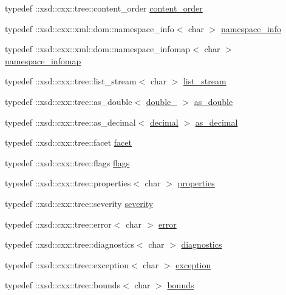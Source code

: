 \begin{DoxyCompactItemize}
\item 
typedef \+::xsd\+::cxx\+::tree\+::content\+\_\+order \hyperlink{namespacexml__schema_ae41cf99d54d24cb0112ce5dc08726476}{content\+\_\+order}
\item 
typedef \+::xsd\+::cxx\+::xml\+::dom\+::namespace\+\_\+info$<$ char $>$ \hyperlink{namespacexml__schema_a3bd77dc3d8c54be1c5369ce1aa8abebf}{namespace\+\_\+info}
\item 
typedef \+::xsd\+::cxx\+::xml\+::dom\+::namespace\+\_\+infomap$<$ char $>$ \hyperlink{namespacexml__schema_a17712c8260e03226f0a9e4d21ab78f42}{namespace\+\_\+infomap}
\item 
typedef \+::xsd\+::cxx\+::tree\+::list\+\_\+stream$<$ char $>$ \hyperlink{namespacexml__schema_a840728106ddd08800e62729d4eddbbc8}{list\+\_\+stream}
\item 
typedef \+::xsd\+::cxx\+::tree\+::as\+\_\+double$<$ \hyperlink{namespacexml__schema_aac2d3d3483d3a20e8d96d2e8e5b3a470}{double\+\_\+} $>$ \hyperlink{namespacexml__schema_a87206181e6830ca01769709c8652e04f}{as\+\_\+double}
\item 
typedef \+::xsd\+::cxx\+::tree\+::as\+\_\+decimal$<$ \hyperlink{namespacexml__schema_a69bfaf24f63a8c18ebd8e21db6b343df}{decimal} $>$ \hyperlink{namespacexml__schema_a9f2da4453eff69ce95bda90bc5be140c}{as\+\_\+decimal}
\item 
typedef \+::xsd\+::cxx\+::tree\+::facet \hyperlink{namespacexml__schema_a93c13629796b43b1cc518145be3f5390}{facet}
\item 
typedef \+::xsd\+::cxx\+::tree\+::flags \hyperlink{namespacexml__schema_a0612287d030cb2732d31a45b258fdc87}{flags}
\item 
typedef \+::xsd\+::cxx\+::tree\+::properties$<$ char $>$ \hyperlink{namespacexml__schema_a1a8ebac679580b41baebd62c7d641c1d}{properties}
\item 
typedef \+::xsd\+::cxx\+::tree\+::severity \hyperlink{namespacexml__schema_a7d2d246dda9239f18f1866a1cdb4022e}{severity}
\item 
typedef \+::xsd\+::cxx\+::tree\+::error$<$ char $>$ \hyperlink{namespacexml__schema_a25204746dcf5a00a92e68d214a894b84}{error}
\item 
typedef \+::xsd\+::cxx\+::tree\+::diagnostics$<$ char $>$ \hyperlink{namespacexml__schema_a0d9a5a38c30964872464e338625301d8}{diagnostics}
\item 
typedef \+::xsd\+::cxx\+::tree\+::exception$<$ char $>$ \hyperlink{namespacexml__schema_a1e9265f27587f794fe1b02f5cefb447f}{exception}
\item 
typedef \+::xsd\+::cxx\+::tree\+::bounds$<$ char $>$ \hyperlink{namespacexml__schema_a0130942a2c58fd1fda434722d42ede1d}{bounds}

\end{DoxyCompactItemize}
